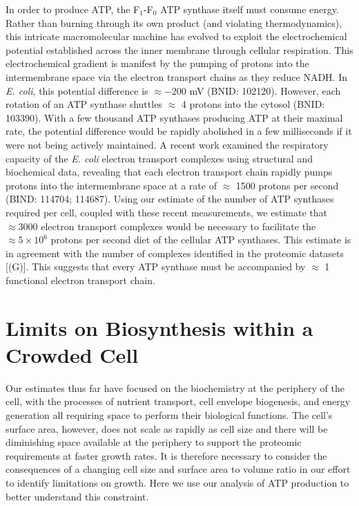 In order to produce ATP, the F$_1$-F$_0$ ATP synthase itself must consume
energy. Rather than burning through its own product (and violating
thermodynamics), this intricate macromolecular machine has evolved to exploit
the electrochemical potential established across the inner membrane through
cellular respiration. This electrochemical gradient is manifest by the pumping
of protons into the intermembrane space via the electron transport chains as
they reduce NADH. In \textit{E. coli}, this potential difference is $\approx
-$200 mV (BNID: 102120). However, each rotation of an ATP synthase shuttles
$\approx$ 4 protons into the cytosol (BNID: 103390). With a few thousand ATP
synthases producing ATP at their maximal rate, the potential difference would be
rapidly abolished in a few milliseconds if it were not being actively
maintained. A recent work \citep{szenk2017} examined the respiratory capacity of
the \textit{E. coli} electron transport complexes using structural and
biochemical data, revealing that each electron transport chain rapidly pumps
protons into the intermembrane space at a rate of $\approx$ 1500 protons per
second (BIND: 114704; 114687). Using our estimate of the number of ATP synthases
required per cell, coupled with these recent measurements, we estimate that
$\approx 3000$ electron transport complexes would be necessary to facilitate the
$\approx 5 \times 10^6$ protons per second diet of the cellular ATP synthases.
This estimate is in agreement with the number of complexes identified in the
proteomic datasets [(G)]. This suggests
that every ATP synthase must be accompanied by $\approx$ 1 functional electron
transport chain.

\section{Limits on Biosynthesis within a Crowded Cell}
Our estimates thus far have focused on the biochemistry at the periphery of the
cell, with the processes of nutrient transport, cell envelope biogenesis, and
energy generation all requiring space to perform their biological functions. The
cell's surface area, however, does not scale as rapidly as cell size
\citep{harris2018} and there will be diminishing space available at the
periphery to support the proteomic requirements at faster growth rates. It is
therefore necessary to consider the consequences of a changing cell size and surface area to
volume ratio in our effort to identify limitations on growth. Here we use our
analysis of ATP production to better understand this constraint.

